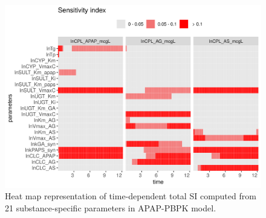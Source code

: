 \documentclass[preprint,12pt, a4paper]{elsarticle}
\begin{document}
\begin{landscape}
\begin{figure}
\includegraphics[width=1\linewidth]{example-2} 
\caption{Heat map representation of time-dependent total SI computed from 21 substance-specific parameters in APAP-PBPK model.}
\label{fig:example-2}
\end{figure}

\end{landscape}
\end{document}

